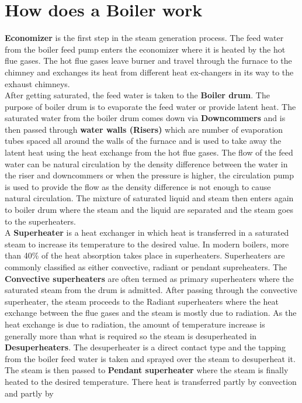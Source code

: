 \documentclass[english,11pt]{report}
\begin{document}
\section{How does a Boiler work}
\textbf{Economizer} is the first step in the steam generation process. The feed water from the boiler feed pump enters the economizer where it is heated by the hot flue gases. The hot flue gases
leave burner and travel through the furnace to the chimney and exchanges its heat from
different heat ex-changers in its way to the exhaust chimneys.\\[1em]
After getting saturated, the feed water is taken to the \textbf{Boiler drum}. The purpose of boiler drum is to evaporate the feed water or provide latent heat. The saturated water from the boiler drum comes down via \textbf{Downcommers} and is then passed through \textbf{water walls (Risers)} which are number of evaporation tubes spaced all around the walls of the furnace and is used to take away the latent heat using the heat exchange from the hot flue gases. The flow of the feed
water can be natural circulation by the density difference between the water in the riser and
downcommers or when the pressure is higher, the circulation pump is used to provide the flow
as the density difference is not enough to cause natural circulation. The mixture of saturated
liquid and steam then enters again to boiler drum where the steam and the liquid are separated
and the steam goes to the superheaters.\\[1em]
A \textbf{Superheater} is a heat exchanger in which heat is transferred in a saturated steam to increase its temperature to the desired value. In modern boilers, more than 40\% of the heat absorption takes place in superheaters. Superheaters are commonly classified as either convective, radiant or pendant supreheaters. The \textbf{Convective superheaters} are often termed as primary
superheaters where the saturated steam from the drum is admitted. After passing through the
convective superheater, the steam proceeds to the Radiant superheaters where the heat
exchange between the flue gases and the steam is mostly due to radiation. As the heat
exchange is due to radiation, the amount of temperature increase is generally more than what
is required so the steam is desuperheated in \textbf{Desuperheaters}. The desuperheater is a direct
contact type and the tapping from the boiler feed water is taken and sprayed over the steam to
desuperheat it. The steam is then passed to \textbf{Pendant superheater} where the steam is finally
heated to the desired temperature. There heat is transferred partly by convection and partly by
\end{document}
